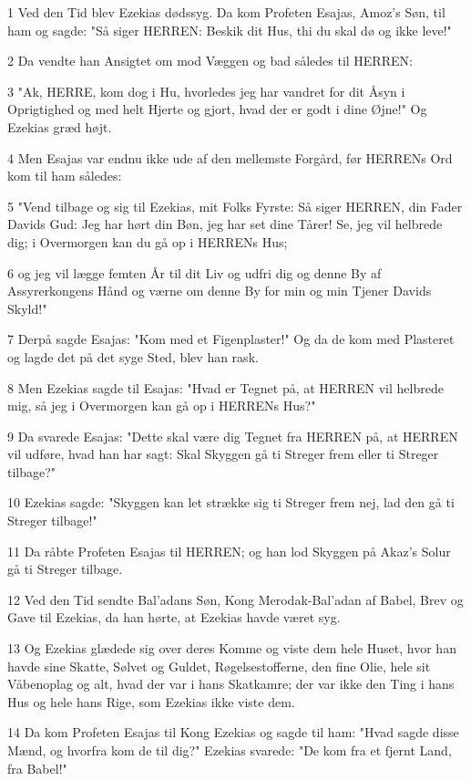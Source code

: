 \par 1 Ved den Tid blev Ezekias dødssyg. Da kom Profeten Esajas, Amoz's Søn, til ham og sagde: "Så siger HERREN: Beskik dit Hus, thi du skal dø og ikke leve!"
\par 2 Da vendte han Ansigtet om mod Væggen og bad således til HERREN:
\par 3 "Ak, HERRE, kom dog i Hu, hvorledes jeg har vandret for dit Åsyn i Oprigtighed og med helt Hjerte og gjort, hvad der er godt i dine Øjne!" Og Ezekias græd højt.
\par 4 Men Esajas var endnu ikke ude af den mellemste Forgård, før HERRENs Ord kom til ham således:
\par 5 "Vend tilbage og sig til Ezekias, mit Folks Fyrste: Så siger HERREN, din Fader Davids Gud: Jeg har hørt din Bøn, jeg har set dine Tårer! Se, jeg vil helbrede dig; i Overmorgen kan du gå op i HERRENs Hus;
\par 6 og jeg vil lægge femten År til dit Liv og udfri dig og denne By af Assyrerkongens Hånd og værne om denne By for min og min Tjener Davids Skyld!"
\par 7 Derpå sagde Esajas: "Kom med et Figenplaster!" Og da de kom med Plasteret og lagde det på det syge Sted, blev han rask.
\par 8 Men Ezekias sagde til Esajas: "Hvad er Tegnet på, at HERREN vil helbrede mig, så jeg i Overmorgen kan gå op i HERRENs Hus?"
\par 9 Da svarede Esajas: "Dette skal være dig Tegnet fra HERREN på, at HERREN vil udføre, hvad han har sagt: Skal Skyggen gå ti Streger frem eller ti Streger tilbage?"
\par 10 Ezekias sagde: "Skyggen kan let strække sig ti Streger frem nej, lad den gå ti Streger tilbage!"
\par 11 Da råbte Profeten Esajas til HERREN; og han lod Skyggen på Akaz's Solur gå ti Streger tilbage.
\par 12 Ved den Tid sendte Bal'adans Søn, Kong Merodak-Bal'adan af Babel, Brev og Gave til Ezekias, da han hørte, at Ezekias havde været syg.
\par 13 Og Ezekias glædede sig over deres Komme og viste dem hele Huset, hvor han havde sine Skatte, Sølvet og Guldet, Røgelsestofferne, den fine Olie, hele sit Våbenoplag og alt, hvad der var i hans Skatkamre; der var ikke den Ting i hans Hus og hele hans Rige, som Ezekias ikke viste dem.
\par 14 Da kom Profeten Esajas til Kong Ezekias og sagde til ham: "Hvad sagde disse Mænd, og hvorfra kom de til dig?" Ezekias svarede: "De kom fra et fjernt Land, fra Babel!"
